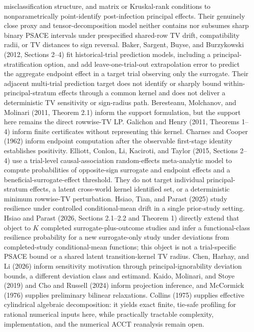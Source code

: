 \documentclass{article}
\begin{document}
misclassification structure, and matrix or Kruskal-rank conditions to nonparametrically point-identify post-infection principal effects. Their genuinely close proxy and tensor-decomposition model neither contains nor subsumes sharp binary PSACE intervals under prespecified shared-row TV drift, compatibility radii, or TV distances to sign reversal. Baker, Sargent, Buyse, and Burzykowski (2012, Sections 2--4) fit historical-trial prediction models, including a principal-stratification option, and add leave-one-trial-out extrapolation error to predict the aggregate endpoint effect in a target trial observing only the surrogate. Their adjacent multi-trial prediction target does not identify or sharply bound within-principal-stratum effects through a common kernel and does not deliver a deterministic TV sensitivity or sign-radius path. Beresteanu, Molchanov, and Molinari (2011, Theorem 2.1) inform the support formulation, but the support here remains the direct rowwise-TV LP. Galichon and Henry (2011, Theorems 1--4) inform finite certificates without representing this kernel. Charnes and Cooper (1962) inform endpoint computation after the observable first-stage identity establishes positivity. Elliott, Conlon, Li, Kaciroti, and Taylor (2015, Sections 2--4) use a trial-level causal-association random-effects meta-analytic model to compute probabilities of opposite-sign surrogate and endpoint effects and a beneficial-surrogate-effect threshold. They do not target individual principal-stratum effects, a latent cross-world kernel identified set, or a deterministic minimum rowwise-TV perturbation. Hsiao, Tian, and Parast (2025) study resilience under controlled conditional-mean drift in a single prior-study setting. Hsiao and Parast (2026, Sections 2.1--2.2 and Theorem 1) directly extend that object to \(K\) completed surrogate-plus-outcome studies and infer a functional-class resilience probability for a new surrogate-only study under deviations from completed-study conditional-mean functions; this object is not a trial-specific PSACE bound or a shared latent transition-kernel TV radius. Chen, Harhay, and Li (2026) inform sensitivity motivation through principal-ignorability deviation bounds, a different deviation class and estimand. Kaido, Molinari, and Stoye (2019) and Cho and Russell (2024) inform projection inference, and McCormick (1976) supplies preliminary bilinear relaxations. Collins (1975) supplies effective cylindrical algebraic decomposition: it yields exact finite, tie-safe profiling for rational numerical inputs here, while practically tractable complexity, implementation, and the numerical ACCT reanalysis remain open.
\end{document}
